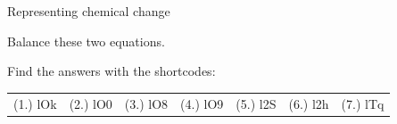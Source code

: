 \begin{eocexercises}{Representing chemical change}
\begin{enumerate}[noitemsep, label=\textbf{\arabic*}. ]
\begin{equation}
      \end{equation}
Balance these two equations.\newline
\end{enumerate}
  \label{m38727**end}
  \label{337cc49099d6e82169c54b5d0fc3878f**end}
\par {} Find the answers with the shortcodes:
 \par \begin{tabular}[h]{cccccc}
 (1.) lOk  &  (2.) lO0  &  (3.) lO8  &  (4.) lO9  &  (5.) l2S  &  (6.) l2h  &  (7.) lTq  & \end{tabular}
\end{eocexercises}
